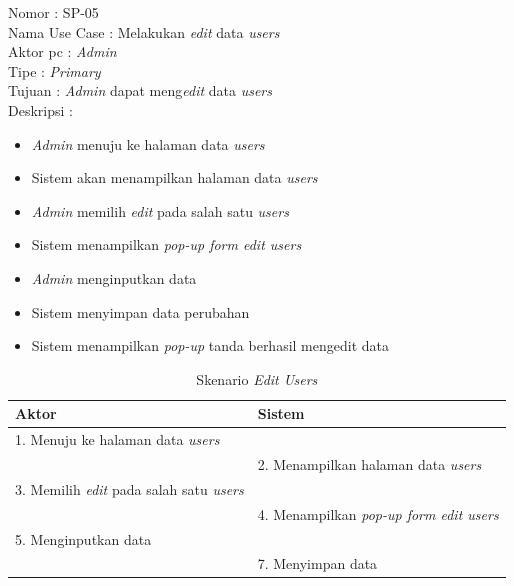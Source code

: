 \begin{enumerate}
Nomor \kern 3.6pc : SP-05 \\
Nama Use Case : Melakukan \textit{edit} data \textit{users} \\
Aktor  pc : \textit{Admin} \\
Tipe \kern 4.6pc : \textit{Primary} \\
Tujuan \kern 3.6pc : \textit{Admin} dapat meng\textit{edit} data \textit{users} \\
Deskripsi \kern 2.5pc : 

\begin{itemize}
	\item \textit{Admin} menuju ke halaman data \textit{users}
	\item Sistem akan menampilkan halaman data \textit{users}
	\item \textit{Admin} memilih \textit{edit} pada salah satu \textit{users}
	\item Sistem menampilkan \textit{pop-up form edit users}
	\item \textit{Admin} menginputkan data
	\item Sistem menyimpan data perubahan
	\item Sistem menampilkan \textit{pop-up} tanda berhasil mengedit data
	
\end{itemize}

\begin{table}
	\caption{Skenario \textit{Edit Users}}
	\centering
	\begin{tabular}{ | l | p{65mm} |}
		\hline 
		\textbf{Aktor} & \textbf{Sistem} \\
		\hline
		
		1.	Menuju ke halaman data \textit{users} &  \\
		
		\hline
		
		&  2.	Menampilkan halaman data \textit{users} \\
		
		\hline
		
		3. Memilih \textit{edit} pada salah satu \textit{users} & \\
		
		\hline
		
		& 4.	Menampilkan \textit{pop-up form edit users} \\
		
		\hline
		
		5.	Menginputkan data  & \\
		\hline
		
		& 7.	Menyimpan data \\
		\hline
		

\end{tabular}
\end{table}
\end{enumerate}
